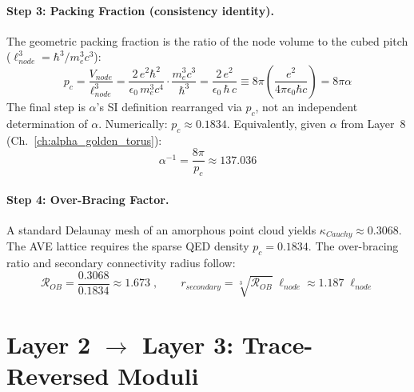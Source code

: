 \paragraph{Step 3: Packing Fraction (consistency identity).}
The geometric packing fraction is the ratio of the node volume to the
cubed pitch ($\ell_{node}^3 = \hbar^3 / m_e^3 c^3$):
\begin{equation}
    p_c
    = \frac{V_{node}}{\ell_{node}^3}
    = \frac{2\,e^2 \hbar^2}{\epsilon_0\,m_e^3 c^4}
      \cdot \frac{m_e^3 c^3}{\hbar^3}
    = \frac{2\,e^2}{\epsilon_0\,\hbar\,c}
    \equiv 8\pi\!\left(\frac{e^2}{4\pi\epsilon_0 \hbar c}\right)
    = \boxed{8\pi\alpha}
    \label{eq:pc}
\end{equation}
The final step is $\alpha$'s SI definition rearranged via $p_c$, not an
independent determination of $\alpha$. Numerically: $p_c \approx 0.1834$.
Equivalently, given $\alpha$ from Layer~8 (Ch.~\ref{ch:alpha_golden_torus}):
\begin{equation}
    \alpha^{-1} = \frac{8\pi}{p_c} \approx 137.036
    \label{eq:alpha_inverse}
\end{equation}

\paragraph{Step 4: Over-Bracing Factor.}
A standard Delaunay mesh of an amorphous point cloud yields
$\kappa_{Cauchy} \approx 0.3068$. The AVE lattice requires the sparse
QED density $p_c = 0.1834$. The over-bracing ratio and secondary connectivity
radius follow:
\begin{equation}
    \mathcal{R}_{OB}
    = \frac{0.3068}{0.1834} \approx 1.673
    \;,\qquad
    r_{secondary}
    = \sqrt[3]{\mathcal{R}_{OB}}\;\ell_{node}
    \approx 1.187\;\ell_{node}
    \label{eq:overbracing}
\end{equation}

\section{Layer 2 $\to$ Layer 3: Trace-Reversed Moduli}
\label{sec:layer23}

